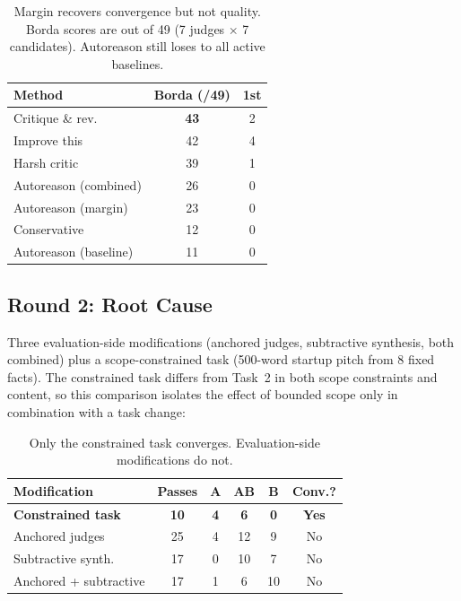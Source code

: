 \documentclass[10pt,twocolumn]{article}
\begin{document}
\begin{table}[H]
\centering
\small
\begin{tabular}{@{}lcc@{}}
\toprule
\textbf{Method} & \textbf{Borda (/49)} & \textbf{1st} \\
\midrule
\rowcolor{TableShade}
Critique \& rev. & \textbf{43} & 2 \\
Improve this & 42 & 4 \\
\rowcolor{TableShade}
Harsh critic & 39 & 1 \\
Autoreason (combined) & 26 & 0 \\
\rowcolor{TableShade}
Autoreason (margin) & 23 & 0 \\
Conservative & 12 & 0 \\
\rowcolor{TableShade}
Autoreason (baseline) & 11 & 0 \\
\bottomrule
\end{tabular}
\caption{Margin recovers convergence but not quality. Borda scores are out of 49 (7 judges $\times$ 7 candidates). Autoreason still loses to all active baselines.}
\label{tab:remedy_quality}
\end{table}

\subsection{Round 2: Root Cause}

Three evaluation-side modifications (anchored judges, subtractive synthesis, both combined) plus a scope-constrained task (500-word startup pitch from 8 fixed facts). The constrained task differs from Task~2 in both scope constraints and content, so this comparison isolates the effect of bounded scope only in combination with a task change:

\begin{table}[H]
\centering
\small
\begin{tabular}{@{}lccccc@{}}
\toprule
\textbf{Modification} & \textbf{Passes} & \textbf{A} & \textbf{AB} & \textbf{B} & \textbf{Conv.?} \\
\midrule
\rowcolor{TableShade}
\textbf{Constrained task} & \textbf{10} & \textbf{4} & \textbf{6} & \textbf{0} & \textbf{Yes} \\
Anchored judges & 25 & 4 & 12 & 9 & No \\
\rowcolor{TableShade}
Subtractive synth. & 17 & 0 & 10 & 7 & No \\
Anchored + subtractive & 17 & 1 & 6 & 10 & No \\
\bottomrule
\end{tabular}
\caption{Only the constrained task converges. Evaluation-side modifications do not.}
\label{tab:v3_remedies}
\end{table}
\end{document}
